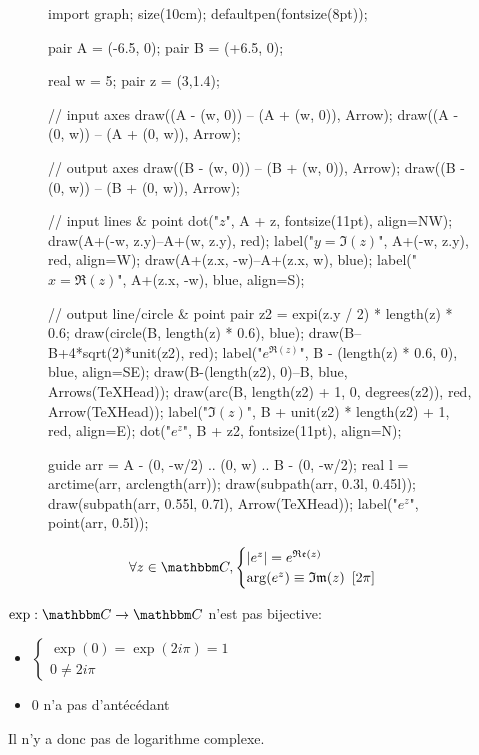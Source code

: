 \begin{prop}
	\begin{minipage}
		{\linewidth}
		\begin{wrapfigure}
			{r}{0.5\linewidth}
			\centering
			\begin{asy}[width=8cm]
				import graph;
				size(10cm);
				defaultpen(fontsize(8pt));

				pair A = (-6.5, 0);
				pair B = (+6.5, 0);

				real w = 5;
				pair z = (3,1.4);

				// input axes
				draw((A - (w, 0)) -- (A + (w, 0)), Arrow);
				draw((A - (0, w)) -- (A + (0, w)), Arrow);

				// output axes
				draw((B - (w, 0)) -- (B + (w, 0)), Arrow);
				draw((B - (0, w)) -- (B + (0, w)), Arrow);

				// input lines & point
				dot("$z$", A + z, fontsize(11pt), align=NW);
				draw(A+(-w, z.y)--A+(w, z.y), red); label("$y=\Im(z)$", A+(-w, z.y), red, align=W);
				draw(A+(z.x, -w)--A+(z.x, w), blue); label("$x=\Re(z)$", A+(z.x, -w), blue, align=S);

				// output line/circle & point
				pair z2 = expi(z.y / 2) * length(z) * 0.6;
				draw(circle(B, length(z) * 0.6), blue);
				draw(B--B+4*sqrt(2)*unit(z2), red);
				label("$e^{\Re(z)}$", B - (length(z) * 0.6, 0), blue, align=SE);
				draw(B-(length(z2), 0)--B, blue, Arrows(TeXHead));
				draw(arc(B, length(z2) + 1, 0, degrees(z2)), red, Arrow(TeXHead));
				label("$\Im(z)$", B + unit(z2) * length(z2) + 1, red, align=E);
				dot("$e^z$", B + z2, fontsize(11pt), align=N);

				guide arr = A - (0, -w/2) .. (0, w) .. B - (0, -w/2);
				real l = arctime(arr, arclength(arr));
				draw(subpath(arr, 0.3l, 0.45l));
				draw(subpath(arr, 0.55l, 0.7l), Arrow(TeXHead));
				label("$e^z$", point(arr, 0.5l));
			\end{asy}
		\end{wrapfigure}
		\[
			\forall z\in \C, \begin{cases}
				\left| e^z \right| = e^{\Re(z)}\\
				\arg(e^{z}) \equiv \Im(z) \mod{2\pi}
			\end{cases}
		\] 
	\end{minipage}
\end{prop}

\begin{rmk}
	$\exp: \C \to \C$ n'est pas bijective:
	\begin{itemize}
		\item $\begin{cases}
				\exp(0) = \exp(2i\pi) = 1\\
				0 \neq 2i\pi
			\end{cases}$ \\
		\item 0 n'a pas d'antécédant
	\end{itemize}
	Il n'y a donc pas de logarithme complexe.
\end{rmk}
